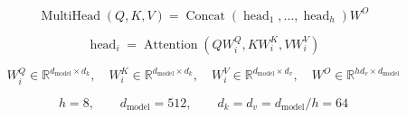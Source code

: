 \[
\operatorname{MultiHead}(Q,K,V)
=
\operatorname{Concat}(\operatorname{head}_1,\ldots,\operatorname{head}_h)W^O
\]

\[
\operatorname{head}_i
=
\operatorname{Attention}(QW_i^Q,KW_i^K,VW_i^V)
\]

\[
W_i^Q \in \mathbb{R}^{d_{\text{model}}\times d_k},
\quad
W_i^K \in \mathbb{R}^{d_{\text{model}}\times d_k},
\quad
W_i^V \in \mathbb{R}^{d_{\text{model}}\times d_v},
\quad
W^O \in \mathbb{R}^{h d_v \times d_{\text{model}}}
\]

\[
h=8,\qquad
d_{\text{model}}=512,\qquad
d_k=d_v=d_{\text{model}}/h=64
\]
